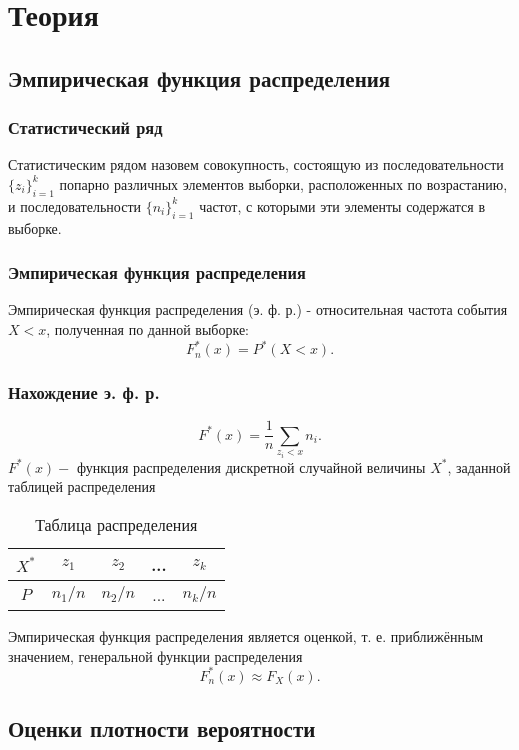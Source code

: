 \documentclass{article}
\begin{document}
\section {Теория}
\subsection{Эмпирическая функция распределения}
\subsubsection{Статистический ряд}
\noindent Статистическим рядом назовем совокупность, состоящую из последовательности $\displaystyle\{z_i\}_{i=1}^k$ попарно различных элементов выборки, расположенных по возрастанию, и последовательности $\displaystyle\{n_i\}_{i=1}^k$ частот, с которыми эти элементы содержатся в выборке.
\subsubsection{Эмпирическая функция распределения}
\noindent Эмпирическая функция распределения (э. ф. р.) - относительная частота события $X < x$, полученная по данной выборке:
\begin{equation}
    F_n^*(x)=P^*(X<x).
\end{equation}
\subsubsection{Нахождение э. ф. р.}
\begin{equation}
    F^*(x)=\frac{1}{n}\sum_{z_i<x}n_i.
\end{equation}
$F^*(x)-$ функция распределения дискретной случайной величины $X^*$, заданной таблицей распределения
\begin{table}[H]
    \centering
    \begin{tabular}{|c|c|c|c|c|}
        \hline
         $X^*$&$z_1$&$z_2$&...&$z_k$\\
         \hline
         $P$&$n_1/n$&$n_2/n$&...&$n_k/n$\\
         \hline
    \end{tabular}
    \caption{Таблица распределения}
    \label{tab:my_label}
\end{table}
\noindent Эмпирическая функция распределения является оценкой, т. е. приближённым значением, генеральной функции распределения
\begin{equation}
    F_n^*(x)\approx F_X(x).
\end{equation}
\subsection{Оценки плотности вероятности}
\end{document}
